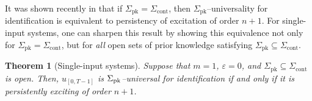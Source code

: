 \documentclass[journal,twoside,web]{ieeecolor}
\newcommand{\set}[2]{\left\{#1 \mid #2\right\}}
\newtheorem{theorem}{Theorem}
\begin{document}

It was shown recently in \cite[Thm. 4]{shakouri2025new} that if $\Sigma_\text{pk}=\Sigma_\text{cont}$, then $\Sigma_\text{pk}$--universality for identification is equivalent to persistency of excitation of order $n+1$. For single-input systems, one can sharpen this result by showing this equivalence not only for $\Sigma_\text{pk}=\Sigma_\text{cont}$, but for \emph{all} open sets of prior knowledge satisfying $\Sigma_\text{pk}\subseteq\Sigma_\text{cont}$.

\begin{theorem}[Single-input systems]
\label{th:single-input-noiseless}
Suppose that $m=1$, $\varepsilon=0$, and $\Sigma_\text{pk}\subseteq\Sigma_\text{cont}$ is open. Then, $u_{[0,T-1]}$ is \mbox{$\Sigma_\textup{pk}$--universal} for identification \emph{if and only if} it is persistently exciting of order $n+1$. 
\end{theorem}

\end{document}
